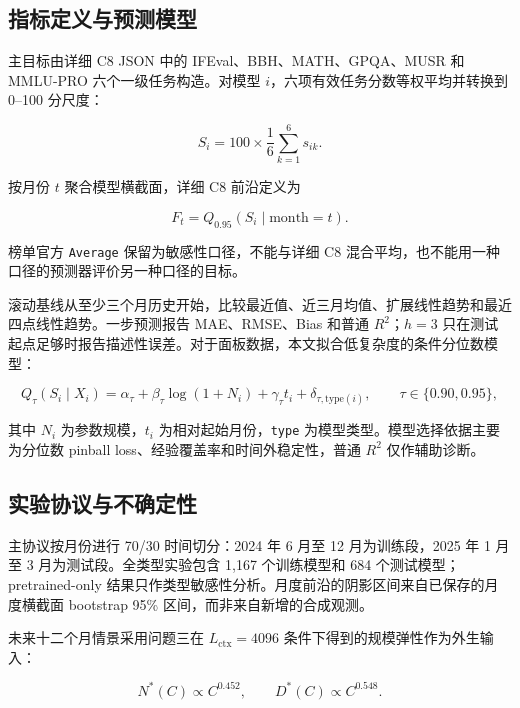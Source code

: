 \subsection{指标定义与预测模型}

主目标由详细 C8 JSON 中的 IFEval、BBH、MATH、GPQA、MUSR 和 MMLU-PRO 六个一级任务构造。对模型 $i$，六项有效任务分数等权平均并转换到 0--100 分尺度：

\begin{equation}
 S_i=100\times\frac{1}{6}\sum_{k=1}^{6}s_{ik}.
 \label{eq:q4-c8}
\end{equation}

按月份 $t$ 聚合模型横截面，详细 C8 前沿定义为

\begin{equation}
 F_t=Q_{0.95}\left(S_i\mid \mathrm{month}=t\right).
 \label{eq:q4-frontier}
\end{equation}

榜单官方 \texttt{Average} 保留为敏感性口径，不能与详细 C8 混合平均，也不能用一种口径的预测器评价另一种口径的目标。

滚动基线从至少三个月历史开始，比较最近值、近三月均值、扩展线性趋势和最近四点线性趋势。一步预测报告 MAE、RMSE、Bias 和普通 $R^2$；$h=3$ 只在测试起点足够时报告描述性误差。对于面板数据，本文拟合低复杂度的条件分位数模型：

\begin{equation}
 Q_{\tau}(S_i\mid X_i)=\alpha_{\tau}+\beta_{\tau}\log(1+N_i)+\gamma_{\tau}t_i+\delta_{\tau,\mathrm{type}(i)},
 \qquad \tau\in\{0.90,0.95\},
 \label{eq:q4-quantile}
\end{equation}

其中 $N_i$ 为参数规模，$t_i$ 为相对起始月份，\texttt{type} 为模型类型。模型选择依据主要为分位数 pinball loss、经验覆盖率和时间外稳定性，普通 $R^2$ 仅作辅助诊断。

\subsection{实验协议与不确定性}

主协议按月份进行 70/30 时间切分：2024 年 6 月至 12 月为训练段，2025 年 1 月至 3 月为测试段。全类型实验包含 1,167 个训练模型和 684 个测试模型；pretrained-only 结果只作类型敏感性分析。月度前沿的阴影区间来自已保存的月度横截面 bootstrap 95\% 区间，而非来自新增的合成观测。

未来十二个月情景采用问题三在 $L_{\mathrm{ctx}}=4096$ 条件下得到的规模弹性作为外生输入：

\begin{equation}
 N^*(C)\propto C^{0.452},\qquad D^*(C)\propto C^{0.548}.
 \label{eq:q4-compute}
\end{equation}

